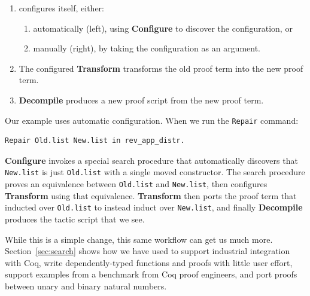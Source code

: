 \begin{enumerate}
\item \toolname configures itself, either:
\begin{enumerate}
\item automatically (left), using \textbf{Configure} to discover the configuration, or
\item manually (right), by taking the configuration as an argument.
\end{enumerate}
\item The configured \textbf{Transform} transforms the old proof term into the new proof term.
\item \textbf{Decompile} produces a new proof script from the new proof term.
\end{enumerate}

Our example uses automatic configuration. When we run the \lstinline{Repair} command:

\begin{lstlisting}
Repair Old.list New.list in rev_app_distr.
\end{lstlisting}
\textbf{Configure} invokes a special search procedure that automatically discovers that \lstinline{New.list}
is just \lstinline{Old.list} with a single moved constructor.
The search procedure proves an equivalence between \lstinline{Old.list} and \lstinline{New.list},
then configures \textbf{Transform} using that equivalence.
\textbf{Transform} then ports the proof term that inducted over \lstinline{Old.list}
to instead induct over \lstinline{New.list}, and finally
\textbf{Decompile} produces the tactic script that we see.

While this is a simple change, this same workflow can get us much more.
Section~\ref{sec:search} shows how we have used \toolname to support industrial integration with Coq,
write dependently-typed functions and proofs with little user effort,
support examples from a benchmark from Coq proof engineers,
and port proofs between unary and binary natural numbers.

